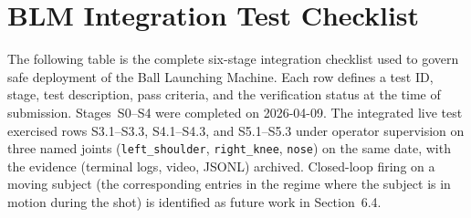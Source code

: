 \cleardoublepage
{}
\chapter{BLM Integration Test Checklist}

The following table is the complete six-stage integration checklist used to govern safe deployment of the Ball Launching Machine. Each row defines a test ID, stage, test description, pass criteria, and the verification status at the time of submission. Stages~S0--S4 were completed on 2026-04-09. The integrated live test exercised rows S3.1--S3.3, S4.1--S4.3, and S5.1--S5.3 under operator supervision on three named joints (\texttt{left\_shoulder}, \texttt{right\_knee}, \texttt{nose}) on the same date, with the evidence (terminal logs, video, JSONL) archived. Closed-loop firing on a moving subject (the corresponding entries in the regime where the subject is in motion during the shot) is identified as future work in Section~6.4.

